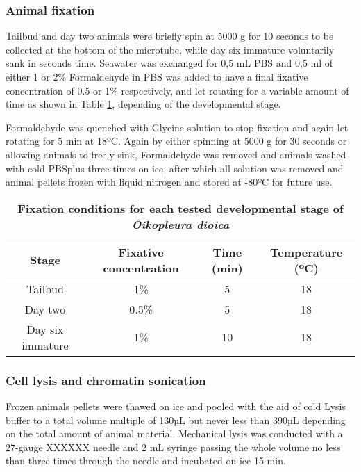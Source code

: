 \documentclass[11pt,twoside,a4paper]{report}
\begin{document}
			\subsubsection{Animal fixation}
			Tailbud and day two animals were briefly spin at 5000 g for 10 seconds to be collected at the bottom of the microtube, while day six immature voluntarily sank in seconds time. Seawater was exchanged for 0,5 mL PBS and 0,5 ml of either 1 or 2\% Formaldehyde in PBS was added to have a final fixative concentration of 0.5 or 1\% respectively, and let rotating for a variable amount of time as shown in Table \ref{table:ODfixation}, depending of the developmental stage. %
			
			Formaldehyde was quenched with Glycine solution to stop fixation and again let rotating for 5 min at 18ºC. 
			Again by either spinning at 5000 g for 30 seconds or allowing animals to freely sink, Formaldehyde was removed and animals washed with cold PBSplus three times on ice, after which all solution was removed and animal pellets frozen with liquid nitrogen and stored at -80ºC for future use.
    
    \begin{table}[!ht]
        \caption{
            \bf{Fixation conditions for each tested developmental stage of \textit{Oikopleura dioica}}
        }
        \begin{center}
            \begin{tabular}{|c|c|c|c|}
                \hline
                Stage & Fixative concentration & Time (min) & Temperature (ºC)\\
                \hline
                Tailbud & 1\% & 5 & 18\\
                Day two & 0.5\% & 5 & 18\\
                Day six immature & 1\% & 10 & 18\\
                \hline
            \end{tabular}
        \end{center}
        \label{table:ODfixation}
    \end{table}
    
    			\subsubsection{Cell lysis and chromatin sonication}
			Frozen animals pellets were thawed on ice and pooled with the aid of cold Lysis buffer to a total volume multiple of 130µL but never less than 390µL depending on the total amount of animal material.		
			Mechanical lysis was conducted with a 27-gauge XXXXXX needle and 2 mL syringe passing the whole volume no less than three times through the needle and incubated on ice 15 min.
			
\end{document}
